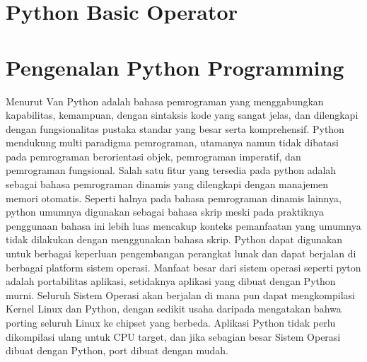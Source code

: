 
\section{Python Basic Operator}
\section{Pengenalan Python Programming}
Menurut Van Python adalah bahasa pemrograman yang menggabungkan kapabilitas, kemampuan, dengan sintaksis kode yang sangat jelas, dan dilengkapi dengan fungsionalitas pustaka standar yang besar serta komprehensif. Python mendukung multi paradigma pemrograman, utamanya namun tidak dibatasi pada pemrograman berorientasi objek, pemrograman imperatif, dan pemrograman fungsional. Salah satu fitur yang tersedia pada python adalah sebagai bahasa pemrograman dinamis yang dilengkapi dengan manajemen memori otomatis. Seperti halnya pada bahasa pemrograman dinamis lainnya, python umumnya digunakan sebagai bahasa skrip meski pada praktiknya penggunaan bahasa ini lebih luas mencakup konteks pemanfaatan yang umumnya tidak dilakukan dengan menggunakan bahasa skrip. Python dapat digunakan untuk berbagai keperluan pengembangan perangkat lunak dan dapat berjalan di berbagai platform sistem operasi. Manfaat besar dari sistem operasi seperti pyton adalah portabilitas aplikasi, setidaknya aplikasi yang dibuat dengan Python murni. Seluruh Sistem Operasi akan berjalan di mana pun dapat mengkompilasi Kernel Linux dan Python, dengan sedikit usaha daripada mengatakan bahwa porting seluruh Linux ke chipset yang berbeda. Aplikasi Python tidak perlu dikompilasi ulang untuk CPU target, dan jika sebagian besar Sistem Operasi dibuat dengan Python, port dibuat dengan mudah. \cite{van2007python}

